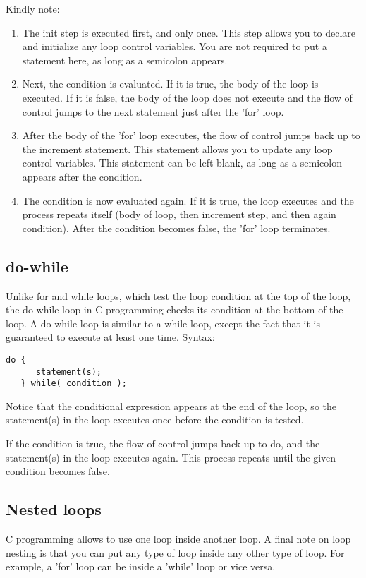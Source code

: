 Kindly note:
\begin{enumerate}
   \item The init step is executed first, and only once. This step allows you to declare and initialize any loop control variables. You are not required to put a statement here, as long as a semicolon appears.

   \item Next, the condition is evaluated. If it is true, the body of the loop is executed. If it is false, the body of the loop does not execute and the flow of control jumps to the next statement just after the 'for' loop.

   \item After the body of the 'for' loop executes, the flow of control jumps back up to the increment statement. This statement allows you to update any loop control variables. This statement can be left blank, as long as a semicolon appears after the condition.

   \item The condition is now evaluated again. If it is true, the loop executes and the process repeats itself (body of loop, then increment step, and then again condition). After the condition becomes false, the 'for' loop terminates.
\end{enumerate}

\subsection{do-while}
Unlike for and while loops, which test the loop condition at the top of the loop, the do-while loop in C programming checks its condition at the bottom of the loop. A do-while loop is similar to a while loop, except the fact that it is guaranteed to execute at least one time. Syntax:

\begin{lstlisting}[style=CStyle]
   do {
      statement(s);
   } while( condition );
\end{lstlisting}

Notice that the conditional expression appears at the end of the loop, so the statement(s) in the loop executes once before the condition is tested.

\par If the condition is true, the flow of control jumps back up to do, and the statement(s) in the loop executes again. This process repeats until the given condition becomes false.


\subsection{Nested loops}
C programming allows to use one loop inside another loop. A final note on loop nesting is that you can put any type of loop inside any other type of loop. For example, a 'for' loop can be inside a 'while' loop or vice versa.


